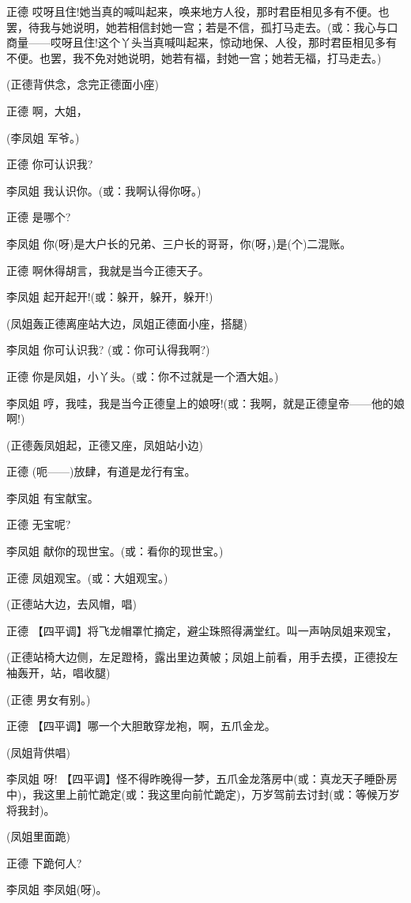 正德
哎呀且住!她当真的喊叫起来，唤来地方人役，那时君臣相见多有不便。也罢，待我与她说明，她若相信封她一宫；若是不信，孤打马走去。(或：我心与口商量------哎呀且住!这个丫头当真喊叫起来，惊动地保、人役，那时君臣相见多有不便。也罢，我不免对她说明，她若有福，封她一宫；她若无福，打马走去。)

(正德背供念，念完正德面小座)

正德 啊，大姐，

(李凤姐 军爷。)

正德 你可认识我?

李凤姐 我认识你。(或：我啊认得你呀。)

正德 是哪个?

李凤姐 你(呀)是大户长的兄弟、三户长的哥哥，你(呀，)是(个)二混账。

正德 啊休得胡言，我就是当今正德天子。

李凤姐 起开起开!(或：躲开，躲开，躲开!)

(凤姐轰正德离座站大边，凤姐正德面小座，搭腿)

李凤姐 你可认识我? (或：你可认得我啊?)

正德 你是凤姐，小丫头。(或：你不过就是一个酒大姐。)

李凤姐
哼，我哇，我是当今正德皇上的娘呀!(或：我啊，就是正德皇帝------他的娘啊!)

(正德轰凤姐起，正德又座，凤姐站小边)

正德 (呃------)放肆，有道是龙行有宝。

李凤姐 有宝献宝。

正德 无宝呢?

李凤姐 献你的现世宝。(或：看你的现世宝。)

正德 凤姐观宝。(或：大姐观宝。)

(正德站大边，去风帽，唱)

正德 【四平调】将飞龙帽罩忙摘定，避尘珠照得满堂红。叫一声呐凤姐来观宝，

(正德站椅大边侧，左足蹬椅，露出里边黄帔；凤姐上前看，用手去摸，正德投左袖轰开，站，唱收腿)

(正德 男女有别。)

正德 【四平调】哪一个大胆敢穿龙袍，啊，五爪金龙。

(凤姐背供唱)

李凤姐 呀!
【四平调】怪不得昨晚得一梦，五爪金龙落房中(或：真龙天子睡卧房中)，我这里上前忙跪定(或：我这里向前忙跪定)，万岁驾前去讨封(或：等候万岁将我封)。

(凤姐里面跪)

正德 下跪何人?

李凤姐 李凤姐(呀)。

